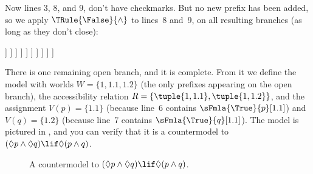 \documentclass[../../../include/open-logic-section]{subfiles}
\begin{document}
{\begin{ex}
  Now lines 3, 8, and 9, don't have checkmarks. But no new prefix has
  been added, so we apply $\TRule{\False}{\land}$ to lines~8 and~9, on
  all resulting branches (as long as they don't close):
  \begin{oltableau}
    [\pFmla{\False}{(\Diamond p \land \Diamond q) \lif \Diamond(p \land q)}{1},
      just = \TAss, checked
      [\pFmla{\True}{\Diamond p \land \Diamond q}{1},
        just = {\TRule{\False}{\lif}[1]}, checked
        [\pFmla{\False}{\Diamond(p \land q)}{1},
          just = {\TRule{\False}{\lif}[1]}
          [\pFmla{\True}{\Diamond p}{1},
            just = {\TRule{\True}{\land}[2]}, checked
            [\pFmla{\True}{\Diamond q}{1},
              just = {\TRule{\True}{\land}[2]}, checked
              [\pFmla{\True}{p}{1.1}, 
                just = {\TRule{\True}{\Diamond}[4]}, checked
                [\pFmla{\True}{q}{1.2}, 
                  just = {\TRule{\True}{\Diamond}[5]}, checked
                  [\pFmla{\False}{p \land q}{1.1}, 
                    just = {\TRule{\False}{\Diamond}[3]}, checked
                    [\pFmla{\False}{p \land q}{1.2}, 
                      just = {\TRule{\False}{\Diamond}[3]}, checked
                      [\pFmla{\False}{p}{1.1},
                        just = {\TRule{\False}{\land}[8]}, checked, close
                      ]
                      [\pFmla{\False}{q}{1.1},
                        just = {\TRule{\False}{\land}[8]}, checked
                        [\pFmla{\False}{p}{1.2},
                          just = {\TRule{\False}{\land}[9]}, checked]
                        [\pFmla{\False}{q}{1.2},
                          just = {\TRule{\False}{\land}[9]}, checked, close]
                      ]
                    ]
                  ]
                ]
              ]
            ]
          ]
        ]
      ]
    ]
  \end{oltableau}
  There is one remaining open branch, and it is complete. From it we
  define the model with worlds $W = \{1, 1.1, 1.2\}$ (the only
  prefixes appearing on the open branch), the accessibility relation
  $R = \{\tuple{1, 1.1}, \tuple{1, 1.2}\}$, and the assignment $V(p) =
  \{1.1\}$ (because line~6 contains $\sFmla{\True}{p}[1.1]$) and
  $V(q) = \{1.2\}$ (because line~7 contains
  $\sFmla{\True}{q}[1.1]$). The model is pictured in
  , and you can verify that it is a
  countermodel to $(\Diamond p \land \Diamond q) \lif \Diamond (p \land q)$.
  \begin{figure}
  \centering
  \caption{A countermodel to $(\Diamond p \land \Diamond q) \lif
    \Diamond (p \land q)$.}
\end{figure}
\end{ex}          
}
\end{document}
